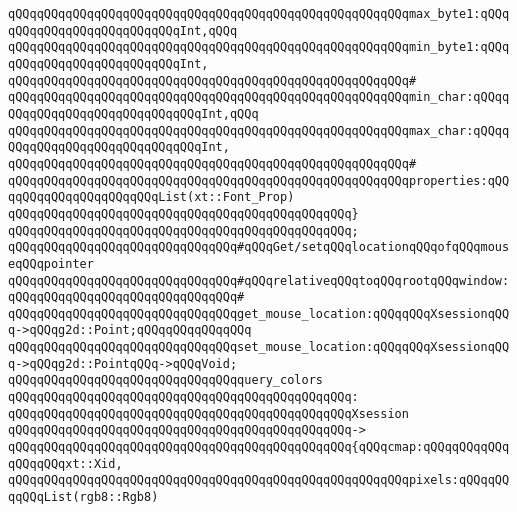 \verb|qQQqqQQqqQQqqQQqqQQqqQQqqQQqqQQqqQQqqQQqqQQqqQQqqQQqqQQqmax_byte1:qQQqqQQqqQQqqQQqqQQqqQQqqQQqInt,qQQq|\newline
\verb|qQQqqQQqqQQqqQQqqQQqqQQqqQQqqQQqqQQqqQQqqQQqqQQqqQQqqQQqmin_byte1:qQQqqQQqqQQqqQQqqQQqqQQqqQQqInt,|\newline
\verb|qQQqqQQqqQQqqQQqqQQqqQQqqQQqqQQqqQQqqQQqqQQqqQQqqQQqqQQq#|\newline
\verb|qQQqqQQqqQQqqQQqqQQqqQQqqQQqqQQqqQQqqQQqqQQqqQQqqQQqqQQqmin_char:qQQqqQQqqQQqqQQqqQQqqQQqqQQqqQQqInt,qQQq|\newline
\verb|qQQqqQQqqQQqqQQqqQQqqQQqqQQqqQQqqQQqqQQqqQQqqQQqqQQqqQQqmax_char:qQQqqQQqqQQqqQQqqQQqqQQqqQQqqQQqInt,|\newline
\verb|qQQqqQQqqQQqqQQqqQQqqQQqqQQqqQQqqQQqqQQqqQQqqQQqqQQqqQQq#|\newline
\verb|qQQqqQQqqQQqqQQqqQQqqQQqqQQqqQQqqQQqqQQqqQQqqQQqqQQqqQQqproperties:qQQqqQQqqQQqqQQqqQQqqQQqList(xt::Font_Prop)|\newline
\verb|qQQqqQQqqQQqqQQqqQQqqQQqqQQqqQQqqQQqqQQqqQQqqQQq}|\newline
\verb|qQQqqQQqqQQqqQQqqQQqqQQqqQQqqQQqqQQqqQQqqQQqqQQq;|\newline
\newline
\verb|qQQqqQQqqQQqqQQqqQQqqQQqqQQqqQQq#qQQqGet/setqQQqlocationqQQqofqQQqmouseqQQqpointer|\newline
\verb|qQQqqQQqqQQqqQQqqQQqqQQqqQQqqQQq#qQQqrelativeqQQqtoqQQqrootqQQqwindow:|\newline
\verb|qQQqqQQqqQQqqQQqqQQqqQQqqQQqqQQq#|\newline
\verb|qQQqqQQqqQQqqQQqqQQqqQQqqQQqqQQqget_mouse_location:qQQqqQQqXsessionqQQq->qQQqg2d::Point;qQQqqQQqqQQqqQQq|\newline
\verb|qQQqqQQqqQQqqQQqqQQqqQQqqQQqqQQqset_mouse_location:qQQqqQQqXsessionqQQq->qQQqg2d::PointqQQq->qQQqVoid;|\newline
\newline
\verb|qQQqqQQqqQQqqQQqqQQqqQQqqQQqqQQqquery_colors|\newline
\verb|qQQqqQQqqQQqqQQqqQQqqQQqqQQqqQQqqQQqqQQqqQQqqQQq:|\newline
\verb|qQQqqQQqqQQqqQQqqQQqqQQqqQQqqQQqqQQqqQQqqQQqqQQqXsession|\newline
\verb|qQQqqQQqqQQqqQQqqQQqqQQqqQQqqQQqqQQqqQQqqQQqqQQq->|\newline
\verb|qQQqqQQqqQQqqQQqqQQqqQQqqQQqqQQqqQQqqQQqqQQqqQQq{qQQqcmap:qQQqqQQqqQQqqQQqqQQqxt::Xid,|\newline
\verb|qQQqqQQqqQQqqQQqqQQqqQQqqQQqqQQqqQQqqQQqqQQqqQQqqQQqqQQqpixels:qQQqqQQqqQQqList(rgb8::Rgb8)|\newline
